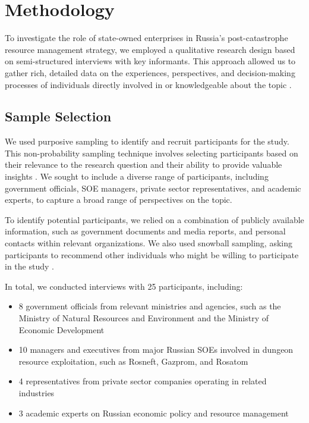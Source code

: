 \documentclass[12pt, a4paper]{article}
\begin{document}
\section{Methodology}
To investigate the role of state-owned enterprises in Russia's post-catastrophe resource management strategy, we employed a qualitative research design based on semi-structured interviews with key informants. This approach allowed us to gather rich, detailed data on the experiences, perspectives, and decision-making processes of individuals directly involved in or knowledgeable about the topic \citep{Bryman2016}.

\subsection{Sample Selection}
We used purposive sampling to identify and recruit participants for the study. This non-probability sampling technique involves selecting participants based on their relevance to the research question and their ability to provide valuable insights \citep{Patton2002}. We sought to include a diverse range of participants, including government officials, SOE managers, private sector representatives, and academic experts, to capture a broad range of perspectives on the topic.

To identify potential participants, we relied on a combination of publicly available information, such as government documents and media reports, and personal contacts within relevant organizations. We also used snowball sampling, asking participants to recommend other individuals who might be willing to participate in the study \citep{Noy2008}.

In total, we conducted interviews with 25 participants, including:

\begin{itemize}
    \item 8 government officials from relevant ministries and agencies, such as the Ministry of Natural Resources and Environment and the Ministry of Economic Development
    \item 10 managers and executives from major Russian SOEs involved in dungeon resource exploitation, such as Rosneft, Gazprom, and Rosatom
    \item 4 representatives from private sector companies operating in related industries
    \item 3 academic experts on Russian economic policy and resource management
\end{itemize}
\end{document}
